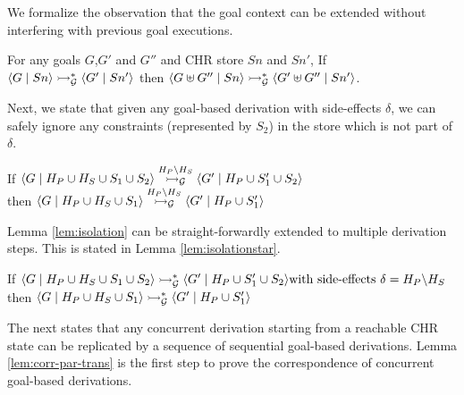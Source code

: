 \documentclass{tlp}
\begin{document}
We formalize the observation that the goal context can
be extended without interfering with previous goal executions. 

\begin{lemma} \label{lem:mono-goals}
   For any goals $G$,$G'$ and $G''$ and CHR store $Sn$ and $Sn'$,
   If $\langle G\mid Sn \rangle \rightarrowtail^*_{\cal G} \langle G'\mid Sn' \rangle$
   then $\langle G \uplus G''\mid Sn \rangle \rightarrowtail^*_{\cal G} \langle G' \uplus G''\mid Sn' \rangle$.
\end{lemma}

Next, we state that
given any goal-based derivation with side-effects
$\delta$, we can safely ignore any constraints (represented by $S_2$) in the store
which is not part of $\delta$. 

\begin{lemma} \label{lem:isolation}
  If
     ${\langle G\mid H_P \cup H_S \cup S_1 \cup S_2 \rangle 
      \stackrel{H_P \backslash H_S}{\rightarrowtail_{\cal G}} 
      \langle G'\mid H_P \cup S_1' \cup S_2 \rangle
     }$
\\
  then
     ${\langle G\mid H_P \cup H_S \cup S_1 \rangle 
      \stackrel{H_P \backslash H_S}{\rightarrowtail_{\cal G}} 
      \langle G'\mid H_P \cup S_1' \rangle}$
\end{lemma}

Lemma \ref{lem:isolation} can be straight-forwardly extended to multiple derivation
steps. This is stated in Lemma \ref{lem:isolationstar}.

\begin{lemma} \label{lem:isolationstar}
 If
     ${\langle G\mid H_P \cup H_S \cup S_1 \cup S_2 \rangle 
      \rightarrowtail^*_{\cal G}
      \langle G'\mid H_P \cup S_1' \cup S_2 \rangle \\
      \mbox{with side-effects } \delta = H_P \backslash H_S
     }$
  then
     ${\langle G\mid H_P \cup H_S \cup S_1 \rangle 
      \rightarrowtail^*_{\cal G} 
      \langle G'\mid H_P \cup S_1' \rangle}$
\end{lemma}


The next states that any concurrent derivation starting from a reachable CHR state
can be replicated by a sequence of sequential goal-based derivations.
Lemma \ref{lem:corr-par-trans} is the first step to prove the correspondence of
concurrent goal-based derivations.
\end{document}

